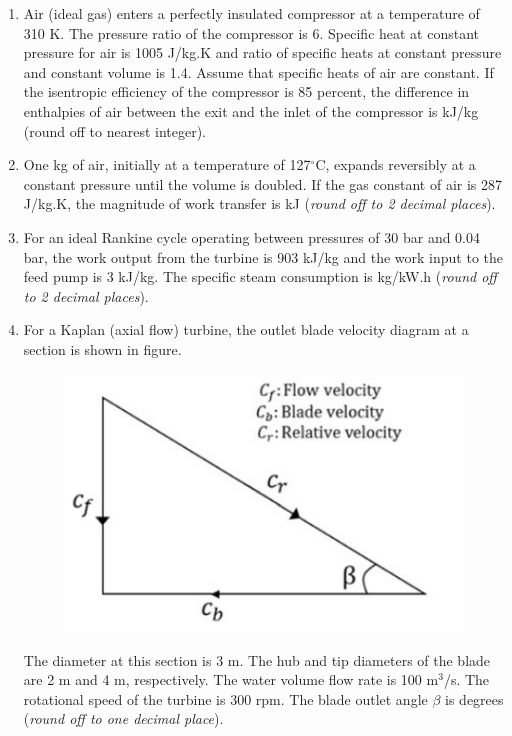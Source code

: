 \documentclass[12pt,onecolumn]{article}
\begin{document}
\begin{enumerate}
    \item Air (ideal gas) enters a perfectly insulated compressor at a temperature of 310 K. The pressure ratio of the compressor is 6. Specific heat at constant pressure for air is 1005 J/kg.K and ratio of specific heats at constant pressure and constant volume is 1.4. Assume that specific heats of air are constant. If the isentropic efficiency of the compressor is 85 percent, the difference in enthalpies of air between the exit and the inlet of the compressor is \underline{\hspace{2cm}} kJ/kg (round off to nearest integer).

    \item One kg of air, initially at a temperature of 127$^\circ$C, expands reversibly at a constant pressure until the volume is doubled. If the gas constant of air is 287 J/kg.K, the magnitude of work transfer is \underline{\hspace{2cm}} kJ (\textit{round off to 2 decimal places}).

    \item For an ideal Rankine cycle operating between pressures of 30 bar and 0.04 bar, the work output from the turbine is 903 kJ/kg and the work input to the feed pump is 3 kJ/kg. The specific steam consumption is \underline{\hspace{2cm}} kg/kW.h (\textit{round off to 2 decimal places}).
    \item For a Kaplan (axial flow) turbine, the outlet blade velocity diagram at a section is shown in figure.
          \begin{figure}[H]
              \centering
              \includegraphics[scale=0.5]{q55}
              \label{fig:q55}
          \end{figure}
          The diameter at this section is 3 m. The hub and tip diameters of the blade are 2 m and 4 m, respectively. The water volume flow rate is 100 m$^3$/s. The rotational speed of the turbine is 300 rpm. The blade outlet angle $\beta$ is \underline{\hspace{2cm}} degrees (\textit{round off to one decimal place}).


\end{enumerate}
\end{document}
